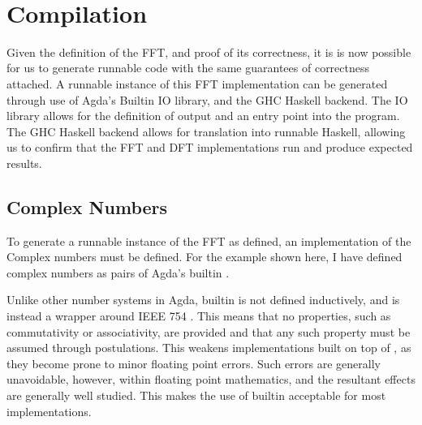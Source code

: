 \begin{code}[hide]%
\>[0]\AgdaSymbol{\{-\#}\AgdaSpace{}%
\AgdaSpace{}%
\AgdaSpace{}%
\AgdaSymbol{\#-\}}\<%
\\
\>[0]\AgdaSpace{}%
\AgdaSpace{}%
\<%
\end{code}
\section{Compilation}

Given the definition of the FFT, and proof of its correctness, it is 
is now possible for us to generate runnable code with the same guarantees of 
correctness attached.
A runnable instance of this FFT implementation can be generated through use of
Agda's Builtin IO library, and the GHC Haskell backend.
The IO library allows for the definition of output and an entry point into the
program.
The GHC Haskell backend allows for translation into runnable Haskell, allowing
us to confirm that the FFT and DFT implementations run and produce expected
results.

\subsection{Complex Numbers}
To generate a runnable instance of the FFT as defined, an implementation of
the Complex numbers must be defined.
For the example shown here, I have defined complex numbers as pairs of
Agda's builtin .

Unlike other number systems in Agda, builtin  is not defined 
inductively, and is instead a wrapper around IEEE 754 \cite{IEEE754}.
This means that no properties, such as commutativity or associativity, are 
provided and that any such property must be assumed through postulations.
This weakens implementations built on top of , as they
become prone to minor floating point errors.
Such errors are generally unavoidable, however, within floating point 
mathematics, and the resultant effects are generally well 
studied.\cite{FFT4Profit}
This makes the use of builtin  acceptable for 
most implementations.

